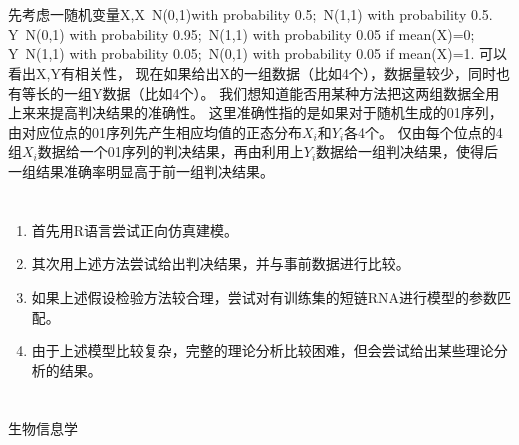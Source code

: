 \documentclass[12pt]{article}
\begin{document}
\section{\textbf{}}
先考虑一随机变量X,X~N(0,1)with probability 0.5;~N(1,1) with probability 0.5.
Y~N(0,1) with probability 0.95;~N(1,1) with probability 0.05 if mean(X)=0;
Y~N(1,1) with probability 0.05;~N(0,1) with probability 0.05 if mean(X)=1.
可以看出X,Y有相关性，
现在如果给出X的一组数据（比如4个），数据量较少，同时也有等长的一组Y数据（比如4个）。
我们想知道能否用某种方法把这两组数据全用上来来提高判决结果的准确性。
这里准确性指的是如果对于随机生成的01序列，由对应位点的01序列先产生相应均值的正态分布$X_i$和$Y_i$各4个。
仅由每个位点的4组$X_i$数据给一个01序列的判决结果，再由利用上$Y_i$数据给一组判决结果，使得后一组结果准确率明显高于前一组判决结果。

\section{\textbf{}}
\begin{enumerate}
\item 首先用R语言尝试正向仿真建模。
\item 其次用上述方法尝试给出判决结果，并与事前数据进行比较。
\item 如果上述假设检验方法较合理，尝试对有训练集的短链RNA进行模型的参数匹配。
\item 由于上述模型比较复杂，完整的理论分析比较困难，但会尝试给出某些理论分析的结果。

\end{enumerate}
\section{\textbf{}}
\begin{thebibliography}{}
 生物信息学
 
\end{thebibliography}
\end{document}
